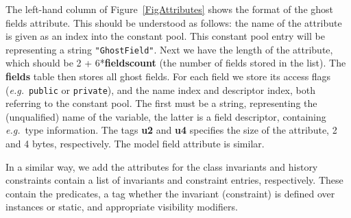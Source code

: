 The left-hand column of Figure~\ref{FigAttributes} shows the format of
the ghost fields attribute. This should be understood as follows: the
name of the attribute is given as an index into the constant
pool. This constant pool entry will be representing a string
\texttt{"Ghost\unsc Field"}. Next we have the length of the attribute,
which should be 2 + 6*\textbf{fields\unsc count} (the number of fields
stored in the list). The \textbf{fields} table then stores all ghost
fields. For each field we store its access flags (\emph{e.g.}\
\texttt{public} or
\texttt{private}), and the name index and descriptor index, both
referring to the constant pool. The first must be a string,
representing the (unqualified) name of the variable, the latter is a
field descriptor, containing \emph{e.g.}\ type information.  The tags
\textbf{u2} and \textbf{u4} specifies the size of the attribute, 2 and
4 bytes, respectively. The model field attribute is similar.

In a similar way, we add the attributes for 
the class invariants and history constraints contain a list of
invariants and constraint entries, respectively. These contain the
predicates, a tag whether the invariant (constraint) is defined over
instances or static, and appropriate visibility modifiers.



